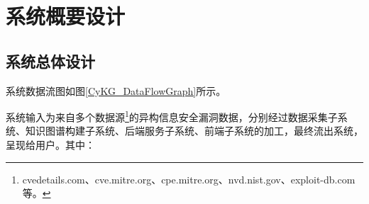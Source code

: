 \documentclass[a4paper,AutoFakeBold,oneside,12pt]{book}
\begin{document}
\section{系统概要设计}

\subsection{系统总体设计}

系统数据流图如图\ref{CyKG_DataFlowGraph}所示。


系统输入为来自多个数据源\footnote{cvedetails.com、cve.mitre.org、cpe.mitre.org、nvd.nist.gov、exploit-db.com 等。}的异构信息安全漏洞数据，分别经过数据采集子系统、知识图谱构建子系统、后端服务子系统、前端子系统的加工，最终流出系统，呈现给用户。其中：
\end{document}
